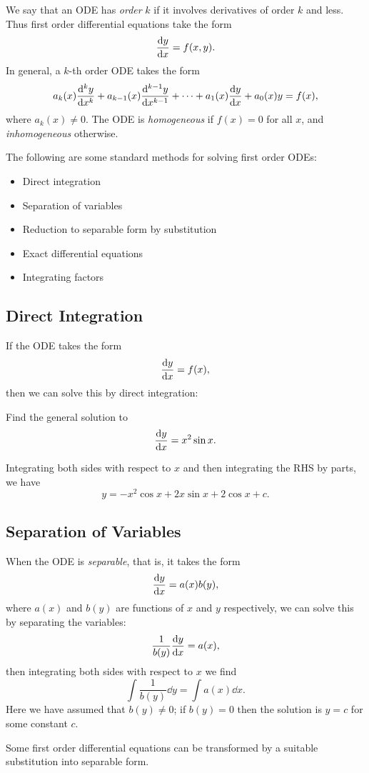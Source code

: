 We say that an ODE has \emph{order} $k$ if it involves derivatives of order $k$ and less. Thus first order differential equations take the form
\[\dv{y}{x}=f(x,y).\]
In general, a $k$-th order ODE takes the form
\[a_k(x)\dv[k]{y}{x}+a_{k-1}(x)\dv[k-1]{y}{x}+\cdots+a_1(x)\dv{y}{x}+a_0(x)y=f(x),\]
where $a_k(x)\neq0$. The ODE is \emph{homogeneous} if $f(x)=0$ for all $x$, and \emph{inhomogeneous} otherwise. 

The following are some standard methods for solving first order ODEs:
\begin{itemize}
\item Direct integration
\item Separation of variables
\item Reduction to separable form by substitution
\item Exact differential equations
\item Integrating factors
\end{itemize}

\subsection{Direct Integration}
If the ODE takes the form
\[\dv{y}{x}=f(x),\]
then we can solve this by direct integration:

\begin{exercise}
Find the general solution to
\[\dv{y}{x}=x^2\sin x.\]
\end{exercise}

\begin{solution}
Integrating both sides with respect to $x$ and then integrating the RHS by parts, we have
\[y=-x^2\cos x+2x\sin x+2\cos x+c.\]
\end{solution}

\subsection{Separation of Variables}
When the ODE is \emph{separable}, that is, it takes the form
\[\dv{y}{x}=a(x)b(y),\]
where $a(x)$ and $b(y)$ are functions of $x$ and $y$ respectively, we can solve this by separating the variables:
\[\frac{1}{b(y)}\dv{y}{x}=a(x),\]
then integrating both sides with respect to $x$ we find
\[\int\frac{1}{b(y)}\dd{y}=\int a(x)\dd{x}.\]
Here we have assumed that $b(y)\neq0$; if $b(y)=0$ then the solution is $y=c$ for some constant $c$.

Some first order differential equations can be transformed by a suitable substitution into separable form.

